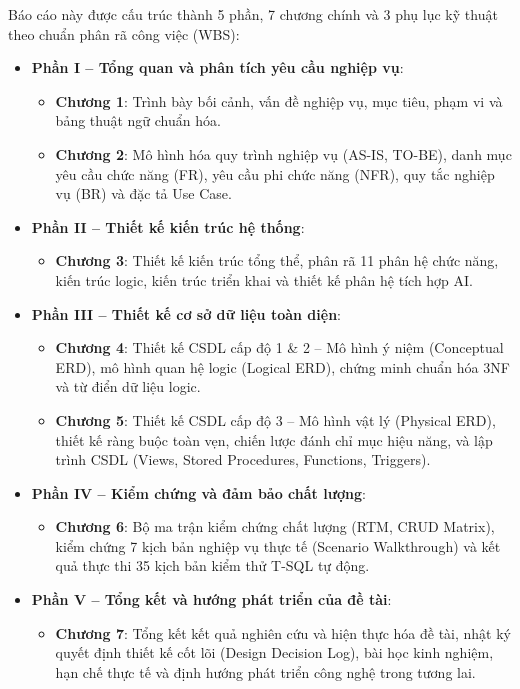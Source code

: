 Báo cáo này được cấu trúc thành 5 phần, 7 chương chính và 3 phụ lục kỹ thuật theo chuẩn phân rã công việc (WBS):
\begin{itemize}
    \item \textbf{Phần I -- Tổng quan và phân tích yêu cầu nghiệp vụ}: 
    \begin{itemize}
        \item \textbf{Chương 1}: Trình bày bối cảnh, vấn đề nghiệp vụ, mục tiêu, phạm vi và bảng thuật ngữ chuẩn hóa.
        \item \textbf{Chương 2}: Mô hình hóa quy trình nghiệp vụ (AS-IS, TO-BE), danh mục yêu cầu chức năng (FR), yêu cầu phi chức năng (NFR), quy tắc nghiệp vụ (BR) và đặc tả Use Case.
    \end{itemize}
    \item \textbf{Phần II -- Thiết kế kiến trúc hệ thống}:
    \begin{itemize}
        \item \textbf{Chương 3}: Thiết kế kiến trúc tổng thể, phân rã 11 phân hệ chức năng, kiến trúc logic, kiến trúc triển khai và thiết kế phân hệ tích hợp AI.
    \end{itemize}
    \item \textbf{Phần III -- Thiết kế cơ sở dữ liệu toàn diện}:
    \begin{itemize}
        \item \textbf{Chương 4}: Thiết kế CSDL cấp độ 1 \& 2 -- Mô hình ý niệm (Conceptual ERD), mô hình quan hệ logic (Logical ERD), chứng minh chuẩn hóa 3NF và từ điển dữ liệu logic.
        \item \textbf{Chương 5}: Thiết kế CSDL cấp độ 3 -- Mô hình vật lý (Physical ERD), thiết kế ràng buộc toàn vẹn, chiến lược đánh chỉ mục hiệu năng, và lập trình CSDL (Views, Stored Procedures, Functions, Triggers).
    \end{itemize}
    \item \textbf{Phần IV -- Kiểm chứng và đảm bảo chất lượng}:
    \begin{itemize}
        \item \textbf{Chương 6}: Bộ ma trận kiểm chứng chất lượng (RTM, CRUD Matrix), kiểm chứng 7 kịch bản nghiệp vụ thực tế (Scenario Walkthrough) và kết quả thực thi 35 kịch bản kiểm thử T-SQL tự động.
    \end{itemize}
    \item \textbf{Phần V -- Tổng kết và hướng phát triển của đề tài}:
    \begin{itemize}
        \item \textbf{Chương 7}: Tổng kết kết quả nghiên cứu và hiện thực hóa đề tài, nhật ký quyết định thiết kế cốt lõi (Design Decision Log), bài học kinh nghiệm, hạn chế thực tế và định hướng phát triển công nghệ trong tương lai.

\end{itemize}
\end{itemize}
